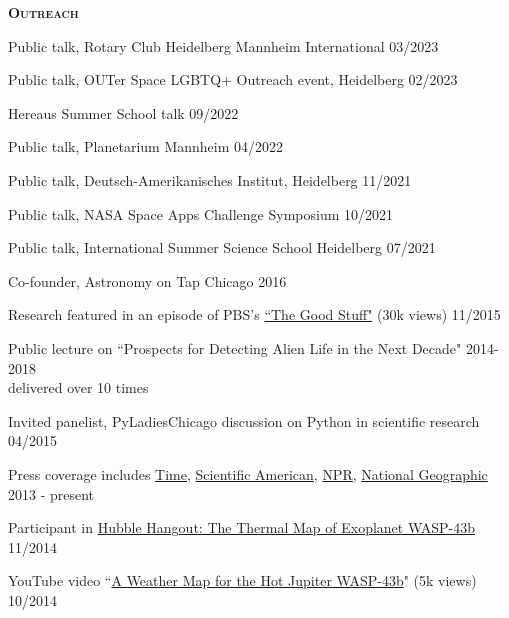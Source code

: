 \documentclass[12pt,letterpaper]{article}
\begin{document}
\textbf{\textsc{Outreach}} 
\begin{compactitem}[]
\item Public talk, Rotary Club Heidelberg Mannheim International \hfill 03/2023
\item Public talk, OUTer Space LGBTQ+ Outreach event, Heidelberg \hfill 02/2023
\item Hereaus Summer School talk \hfill 09/2022
\item Public talk, Planetarium Mannheim \hfill 04/2022
\item Public talk, Deutsch-Amerikanisches Institut, Heidelberg \hfill 11/2021
\item Public talk, NASA Space Apps Challenge Symposium \hfill 10/2021
\item Public talk, International Summer Science School Heidelberg \hfill 07/2021
\item Co-founder, Astronomy on Tap Chicago \hfill 2016
\item Research featured in an episode of PBS's \href{https://www.youtube.com/watch?v=i4Hrmh6LJ0Q&index=2&list=PLsRLUurFnvvXTEbTjA1tvHhWmh6aKTgDw}{``The Good Stuff"} (30k views) \hfill 11/2015
\item Public lecture on ``Prospects for Detecting Alien Life in the Next Decade" \hfill 2014-2018 \\
\hspace*{5 mm}delivered over 10 times
\item Invited panelist, PyLadiesChicago discussion on Python in scientific research \hfill 04/2015
\item Press coverage includes \href{http://science.time.com/2013/12/31/the-real-space-oddities-super-earths-and-jumbo-neptunes/}{Time}, \href{http://www.nature.com/scientificamerican/journal/v23/n3s/full/scientificamericanuniverse0814-4.html}{Scientific American}, \href{http://www.npr.org/2014/01/02/259222620/on-planet-gj1214-b-expect-exotic-cloud-cover}{NPR}, \href{http://news.nationalgeographic.com/news/2014/10/141014-space-hubble-planet-weather-science/?utm_source=Twitter&utm_medium=Social&utm_content=link_tw20141014news-hubbletele&utm_campaign=Content&sf5218387=1}{National Geographic} \hfill 2013 - present
\item Participant in \href{https://www.youtube.com/watch?v=n-oDqYCf3XY}{Hubble Hangout: The Thermal Map of Exoplanet WASP-43b} \hfill 11/2014
\item YouTube video ``\href{https://www.youtube.com/watch?v=tQZqAVhUk9E}{A Weather Map for the Hot Jupiter WASP-43b}" (5k views) \hfill 10/2014

\end{compactitem}
\end{document}
